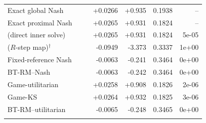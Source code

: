 \begin{tabular}{l r r r r r r}
\quad Exact global Nash &  &  & +0.0266 & +0.935 & 0.1938 & -- \\
\quad Exact proximal Nash &  &  & +0.0265 & +0.931 & 0.1824 & -- \\
\quad \NBPO{} (direct inner solve) &  &  & +0.0265 & +0.931 & 0.1824 & 5e-05 \\
\quad \NBPO{} ($R$-step map)$^{\dagger}$ &  &  & -0.0949 & -3.373 & 0.3337 & 1e+00 \\
\quad Fixed-reference Nash &  &  & -0.0063 & -0.241 & 0.3464 & 0e+00 \\
\quad BT-RM--Nash &  &  & -0.0063 & -0.242 & 0.3464 & 0e+00 \\
\quad Game-utilitarian &  &  & +0.0258 & +0.908 & 0.1826 & 2e-06 \\
\quad Game-KS &  &  & +0.0264 & +0.932 & 0.1825 & 3e-06 \\
\quad BT-RM--utilitarian &  &  & -0.0065 & -0.248 & 0.3465 & 0e+00 \\
\addlinespace
\bottomrule
\end{tabular}
